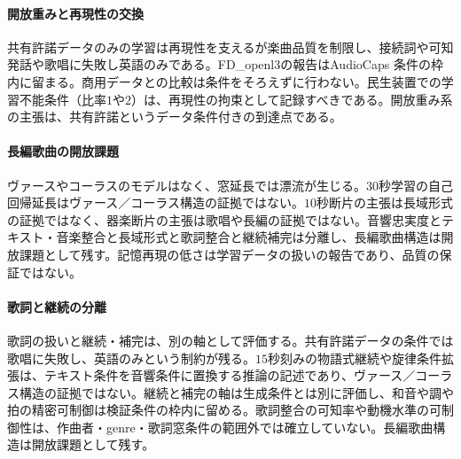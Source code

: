 \documentclass[lualatex,a4paper,10pt]{jlreq}
\begin{document}
\paragraph{開放重みと再現性の交換}
共有許諾データのみの学習は再現性を支えるが楽曲品質を制限し、接続詞や可知発話や歌唱に失敗し英語のみである\autocite{btd068}。FD\_openl3の報告はAudioCaps 条件の枠内に留まる\autocite{btd068}。商用データとの比較は条件をそろえずに行わない\autocite{btd068}。民生装置での学習不能条件（比率$1$や$2$）は、再現性の拘束として記録すべきである\autocite{btd067}。開放重み系の主張は、共有許諾というデータ条件付きの到達点である\autocite{btd068}。

\paragraph{長編歌曲の開放課題}
ヴァースやコーラスのモデルはなく、窓延長では漂流が生じる\autocite{btd063,btd065}。$30$秒学習の自己回帰延長はヴァース／コーラス構造の証拠ではない\autocite{btd065}。$10$秒断片の主張は長域形式の証拠ではなく\autocite{btd069}、器楽断片の主張は歌唱や長編の証拠ではない\autocite{btd136}。音響忠実度とテキスト・音楽整合と長域形式と歌詞整合と継続補完は分離し、長編歌曲構造は開放課題として残す\autocite{btd136}。記憶再現の低さは学習データの扱いの報告であり、品質の保証ではない\autocite{btd065}。

\paragraph{歌詞と継続の分離}
歌詞の扱いと継続・補完は、別の軸として評価する\autocite{btd068,btd069}。共有許諾データの条件では歌唱に失敗し、英語のみという制約が残る\autocite{btd068}。$15$秒刻みの物語式継続や旋律条件拡張は、テキスト条件を音響条件に置換する推論の記述であり、ヴァース／コーラス構造の証拠ではない\autocite{btd065}。継続と補完の軸は生成条件とは別に評価し、和音や調や拍の精密可制御は検証条件の枠内に留める\autocite{btd068,btd069}。歌詞整合の可知率や動機水準の可制御性は、作曲者・genre・歌詞窓条件の範囲外では確立していない\autocite{btd063,btd065}。長編歌曲構造は開放課題として残す\autocite{btd136}。
\end{document}
